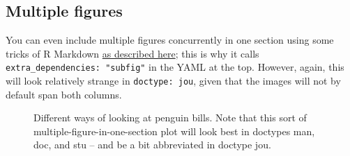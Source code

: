 \documentclass[jou]{apa7}
\begin{document}
\hypertarget{multiple-figures}{%
\subsection{Multiple figures}\label{multiple-figures}}

You can even include multiple figures concurrently in one section using
some tricks of R Markdown
\href{https://bookdown.org/yihui/rmarkdown-cookbook/latex-subfigure.html\#latex-subfigure}{as
described here}; this is why it calls
\texttt{extra\_dependencies:\ "subfig"} in the YAML at the top. However,
again, this will look relatively strange in \texttt{doctype:\ jou},
given that the images will not by default span both columns.

\begin{figure}

{\centering {}\newline{}

}

\caption{Different ways of looking at penguin bills. Note that this sort of multiple-figure-in-one-section plot will look best in doctypes man, doc, and stu -- and be a bit abbreviated in doctype jou.}\label{fig:morepenguins}
\end{figure}
\end{document}
